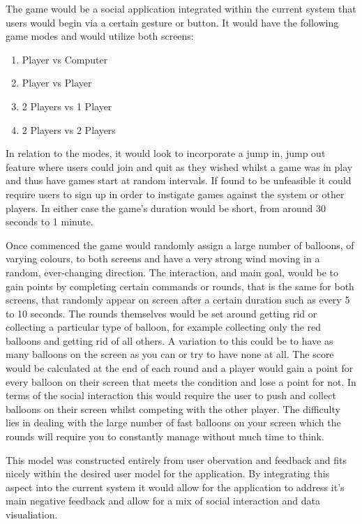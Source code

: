 The game would be a social application integrated within the current system that users would begin via a certain gesture or button. It would have the following game modes and would utilize both screens:

\begin{enumerate}
	\item Player vs Computer
	\item Player vs Player 
	\item 2 Players vs 1 Player
	\item 2 Players vs 2 Players
\end{enumerate}

In relation to the modes, it would look to incorporate a jump in, jump out feature where users could join and quit as they wished whilst a game was in play and thus have games start at random intervals. If found to be unfeasible it could require users to sign up in order to instigate games against the system or other players. In either case the game's duration would be short, from around 30 seconds to 1 minute.

Once commenced the game would randomly assign a large number of balloons, of varying colours, to both screens and have a very strong wind moving in a random, ever-changing direction. The interaction, and main goal, would be to gain points by completing certain commands or rounds, that is the same for both screens, that randomly appear on screen after a certain duration such as every 5 to 10 seconds. The rounds themselves would be set around getting rid or collecting a particular type of balloon, for example collecting only the red balloons and getting rid of all others. A variation to this could be to have as many balloons on the screen as you can or try to have none at all. The score would be calculated at the end of each round and a player would gain a point for every balloon on their screen that meets the condition and lose a point for not. In terms of the social interaction this would require the user to push and collect balloons on their screen whilst competing with the other player. The difficulty lies in dealing with the large number of fast balloons on your screen which the rounds will require you to constantly manage without much time to think.

This model was constructed entirely from user obervation and feedback and fits nicely within the desired user model for the application. By integrating this aspect into the current system it would allow for the application to address it's main negative feedback and allow for a mix of social interaction and data visualiation.
